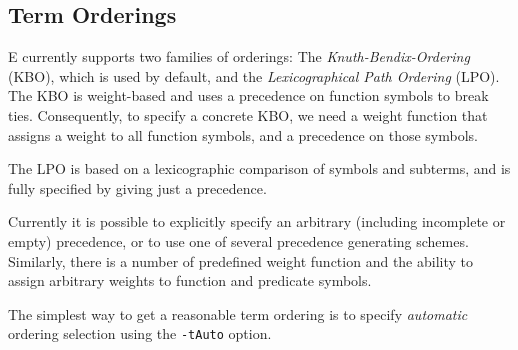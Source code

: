 \documentclass{article}
\begin{document}
\subsection{Term Orderings}
\label{sec:options:orderings}

E currently supports two families of orderings: The
\emph{Knuth-Bendix-Ordering} (KBO), which is used by default, and the
\emph{Lexicographical Path Ordering} (LPO). The KBO is weight-based
and uses a precedence on function symbols to break ties. Consequently,
to specify a concrete KBO, we need a weight function that assigns a
weight to all function symbols, and a precedence on those symbols.

The LPO is based on a lexicographic comparison of symbols and
subterms, and is fully specified by giving just a precedence.

Currently it is possible to explicitly specify an arbitrary
(including incomplete or empty) precedence, or to use one of several
precedence generating schemes. Similarly, there is a number of
predefined weight function and the ability to assign arbitrary weights
to function and predicate symbols.

The simplest way to get a reasonable term ordering is to specify
\emph{automatic} ordering selection using the \texttt{-tAuto} option. 
\end{document}
